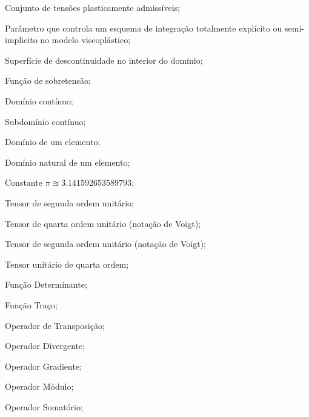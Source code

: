 \item[\textbf{Grego maiúsculo:}]
\item[$ \Gamma $]		Conjunto de tensões plasticamente admissíveis;
\item[$ \Theta $]		Parâmetro que controla um esquema de integração totalmente explícito ou semi-implicito no modelo viscoplástico;
\item[$ \Sigma $]		Superfície de descontinuidade no interior do domínio;
\item[$ \Phi $]		Função de sobretensão;
\item[$ \Omega $] 		Domínio contínuo;
\item[$ \Omega' $] 		Subdomínio contínuo;
\item[$ \Omega_e $] 		Domínio de um elemento;
\item[$\Omega_\xi$] 		Domínio natural de um elemento;

\item[\textbf{Numéricos, operadores e funções matemáticas:}]
\item[$ \pi $] 		Constante $\pi \approxeq 3.141592653589793$;
\item[$ \Umll $] 	Tensor de segunda ordem unitário;
\item[$ \Umll $] 	Tensor de quarta ordem unitário (notação de Voigt);
\item[$ \Uml $] 	Tensor de segunda ordem unitário (notação de Voigt);
\item[$\Umllll$] Tensor unitário de quarta ordem;
\item[det($*$)] 	Função Determinante;
\item[tr($*$)] 	Função Traço;
\item[$(*)^T$] 	Operador de Transposição;
\item[$ \divl $] 	Operador Divergente;
\item[$ \nabla $] 	Operador Gradiente;
\item[$||*||$] 	Operador Módulo;
\item[$\sum *$] 	Operador Somatório;


















